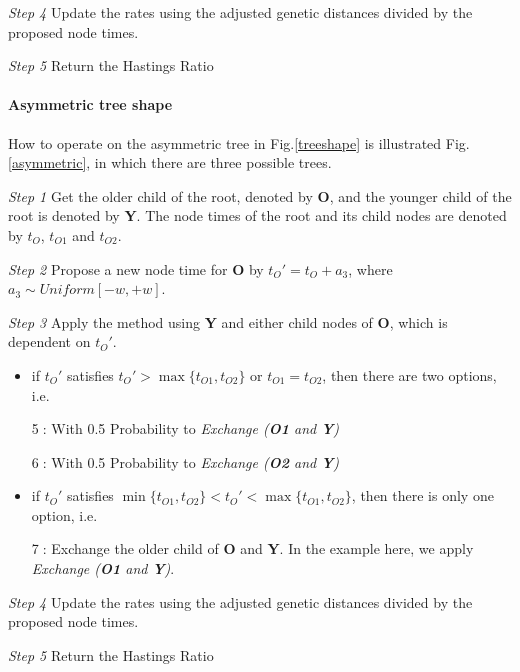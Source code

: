 \documentclass{bmcart}
\begin{document}
\emph{Step 4}  Update the rates using the adjusted genetic distances divided by the proposed node times.

\emph{Step 5} Return the Hastings Ratio
\paragraph*{Asymmetric tree shape}

How to operate on the asymmetric tree in Fig.\ref{treeshape} is illustrated Fig.\ref{asymmetric}, in which there are three possible trees.

\emph{Step 1} Get the older child of the root, denoted by \textbf{O}, and the younger child of the root is denoted by \textbf{Y}. The node times of the root and its child nodes are denoted by ${t_O}$, ${t_{O1}}$ and ${t_{O2}}$.

\emph{Step 2} Propose a new node time for \textbf{O} by ${t_O}' = {t_O} + {a_3}$, where ${a_3} \sim Uniform[ - w, + w]$.

\emph{Step 3} Apply the method using \textbf{Y} and either child nodes of \textbf{O}, which is dependent on ${t_O}'$.
\begin{itemize}
\item if ${t_O}'$ satisfies ${t_O}' > \max \{ {t_{O1}},{t_{O2}}\} $ or ${t_{O1}} = {t_{O2}}$, then there are two options, i.e.

\textcircled5: With 0.5 Probability to \textit{Exchange (\textbf{O1} and \textbf{Y})}

\textcircled6: With 0.5 Probability to \textit{Exchange (\textbf{O2} and \textbf{Y})}
\item if ${t_O}'$ satisfies $\min \{ {t_{O1}},{t_{O2}}\}  < {t_O}' < \max \{ {t_{O1}},{t_{O2}}\} $, then there is only one option, i.e.

\textcircled7: Exchange the older child of \textbf{O} and \textbf{Y}.  In the example here, we apply \textit{Exchange (\textbf{O1}  and \textbf{Y})}.
\end{itemize}

\emph{Step 4}  Update the rates using the adjusted genetic distances divided by the proposed node times.

\emph{Step 5} Return the Hastings Ratio
\end{document}
